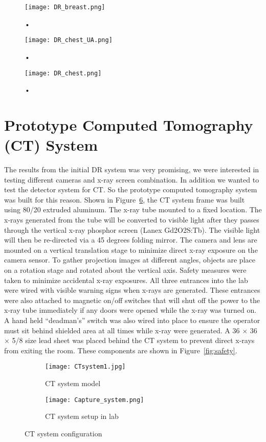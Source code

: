 \begin{figure}
\texttt{[image: DR\_breast.png]}
\caption{•}
\label{fig:DR_breast}
\end{figure}

\begin{figure}
\texttt{[image: DR\_chest\_UA.png]}
\caption{•}
\label{fig:DR_chest_film}
\end{figure}

\begin{figure}
\texttt{[image: DR\_chest.png]}
\caption{•}
\label{fig:DR_chest}
\end{figure}
	
\section{Prototype Computed Tomography (CT) System}
The results from the initial DR system was very promising, we were interested in testing different cameras and x-ray screen combination.  In addition we wanted to test the detector system for CT.  So the prototype computed tomography system was built for this reason.  Shown in Figure~\ref{fig:CTsystem}, the CT system frame was built using 80/20 extruded aluminum.  The x-ray tube mounted to a fixed location.  The x-rays generated from the tube will be converted to visible light after they passes through the vertical x-ray phosphor screen (Lanex Gd2O2S:Tb).  The visible light will then be re-directed via a 45 degrees folding mirror.  The camera and lens are mounted on a vertical translation stage to minimize direct x-ray exposure on the camera sensor.  To gather projection images at different angles, objects are place on a rotation stage and rotated about the vertical axis.  Safety measures were taken to minimize accidental x-ray exposures.  All three entrances into the lab were wired with visible warning signs when x-rays are generated.  These entrances were also attached to magnetic on/off switches that will shut off the power to the x-ray tube immediately if any doors were opened while the x-ray was turned on.  A hand held ``deadman's'' switch was also wired into place to ensure the operator must sit behind shielded area at all times while x-ray were generated.  A 36 \inches $\times$ 36 \inches $\times$ 5/8 \inches size lead sheet was placed behind the CT system to prevent direct x-rays from exiting the room.  These components are shown in Figure~\ref{fig:safety}.

\begin{figure}
	\begin{subfigure}[b]{0.4\linewidth}
	\centering
	\texttt{[image: CTsystem1.jpg]}
	\caption{CT system model}
	\label{fig:CTmodel}
	\end{subfigure}
\hspace{0.2cm}
	\begin{subfigure}[b]{0.4\linewidth}
	\centering
	\texttt{[image: Capture\_system.png]}
	\caption{CT system setup in lab}
	\label{fig:CTlab}
	\end{subfigure}
\caption{CT system configuration}
\label{fig:CTsystem}
\end{figure}

